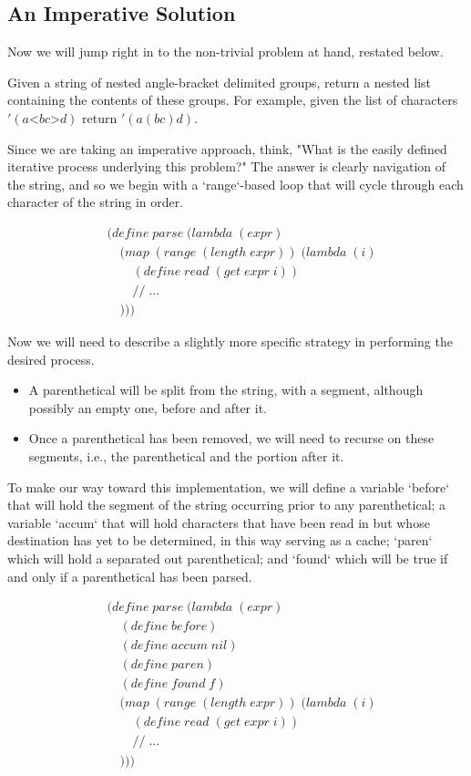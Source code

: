 \documentclass[11pt]{article}
\begin{document}
\subsection{An Imperative Solution}
Now we will jump right in to the non-trivial problem at hand, restated below.

Given a string of nested angle-bracket delimited groups, return a
nested list containing the contents of these groups. For example,
given the list of characters $'(a \text{<} b c \text{>} d)$ return $'(a (b c) d)$.

Since we are taking an imperative approach, think, "What is the easily defined iterative process underlying this problem?" The answer is clearly navigation of the string, and so we begin with a `range`-based loop that will cycle through each character of the string in order.

\begin{align*}
& (define \; parse \; (lambda \; (expr) \; 
\\& \quad (map \; (range \; (length \; expr)) \; (lambda \; (i)
\\& \qquad (define \; read \; (get \; expr \; i))
\\& \qquad // \; \dots
\\& \quad )))
\end{align*}

Now we will need to describe a slightly more specific strategy in performing the desired process.

\begin{itemize}
  \item A parenthetical will be split from the string, with a segment, although possibly an empty one, before and after it.
  \item Once a parenthetical has been removed, we will need to recurse on these segments, i.e., the parenthetical and the portion after it.
\end{itemize}

To make our way toward this implementation, we will define a variable `before` that will hold the segment of the string occurring prior to any parenthetical; a variable `accum` that will hold characters that have been read in but whose destination has yet to be determined, in this way serving as a cache; `paren` which will hold a separated out parenthetical; and `found` which will be true if and only if a parenthetical has been parsed.

\begin{align*}
& (define \; parse \; (lambda \; (expr) \; 
\\& \quad (define \; before)
\\& \quad (define \; accum \; nil)
\\& \quad (define \; paren)
\\& \quad (define \; found \; f)
\\& \quad (map \; (range \; (length \; expr)) \; (lambda \; (i)
\\& \qquad (define \; read \; (get \; expr \; i))
\\& \qquad // \; \dots
\\& \quad )))
\end{align*}
\end{document}
